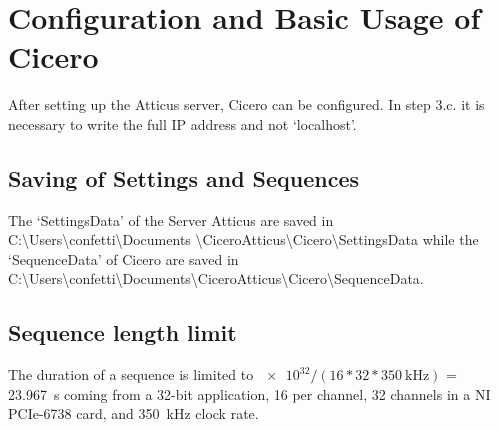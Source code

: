 \section{Configuration and Basic Usage of Cicero}\label{sec:Cicero, Configuration and Basic Usage of Cicero}
After setting up the Atticus server, Cicero can be configured. In step 3.c. it is necessary to write the full IP address and not `localhost'.

\subsection{Saving of Settings and Sequences}\label{sec:Cicero, Saving of Settings and Sequences}
The `SettingsData' of the Server Atticus are saved in C:\textbackslash Users\textbackslash confetti\textbackslash Documents \textbackslash Cicero\textunderscore Atticus\textbackslash Cicero\textbackslash SettingsData while the `SequenceData' of Cicero are saved in C:\textbackslash Users\textbackslash confetti\textbackslash Documents\textbackslash Cicero\textunderscore Atticus\textbackslash Cicero\textbackslash SequenceData.

\subsection{Sequence length limit}\label{sec:cicero, Sequence length limit}
The duration of a sequence is limited to $\num[exponent-base=2]{e32}/(16*32*\SI{350}{\kilo\hertz})$ = \SI{23.967}{\second} coming from a 32-bit application, \SI{16}{\bit} per channel, 32 channels in a NI PCIe-6738 card, and \SI{350}{\kilo\hertz} clock rate.